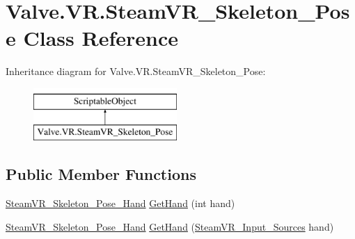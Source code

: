 \hypertarget{class_valve_1_1_v_r_1_1_steam_v_r___skeleton___pose}{}\section{Valve.\+V\+R.\+Steam\+V\+R\+\_\+\+Skeleton\+\_\+\+Pose Class Reference}
\label{class_valve_1_1_v_r_1_1_steam_v_r___skeleton___pose}
Inheritance diagram for Valve.\+V\+R.\+Steam\+V\+R\+\_\+\+Skeleton\+\_\+\+Pose\+:\begin{figure}[H]
\begin{center}
\leavevmode
\includegraphics[height=2.000000cm]{class_valve_1_1_v_r_1_1_steam_v_r___skeleton___pose}
\end{center}
\end{figure}
\subsection*{Public Member Functions}
\begin{DoxyCompactItemize}
\item 
\mbox{\hyperlink{class_valve_1_1_v_r_1_1_steam_v_r___skeleton___pose___hand}{Steam\+V\+R\+\_\+\+Skeleton\+\_\+\+Pose\+\_\+\+Hand}} \mbox{\hyperlink{class_valve_1_1_v_r_1_1_steam_v_r___skeleton___pose_a2b63084089cecb2cc7a1435f1817b2e7}{Get\+Hand}} (int hand)
\item 
\mbox{\hyperlink{class_valve_1_1_v_r_1_1_steam_v_r___skeleton___pose___hand}{Steam\+V\+R\+\_\+\+Skeleton\+\_\+\+Pose\+\_\+\+Hand}} \mbox{\hyperlink{class_valve_1_1_v_r_1_1_steam_v_r___skeleton___pose_adb73696e3f395f3f7127ac6844879908}{Get\+Hand}} (\mbox{\hyperlink{namespace_valve_1_1_v_r_a82e5bf501cc3aa155444ee3f0662853f}{Steam\+V\+R\+\_\+\+Input\+\_\+\+Sources}} hand)
\end{DoxyCompactItemize}
